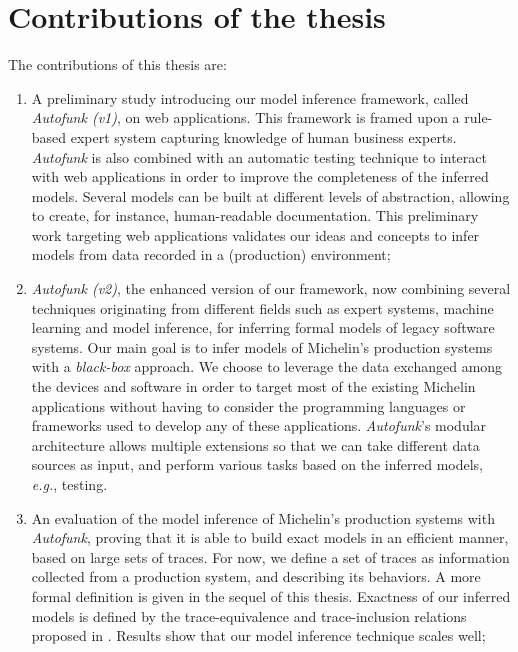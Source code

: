 
\section{Contributions of the thesis}
\label{sec:intro:contrib}

The contributions of this thesis are:

\begin{enumerate}
    \item A preliminary study introducing our model inference
        framework, called \emph{Autofunk (v1)}, on web
        applications. This framework is framed upon a rule-based
        expert system capturing knowledge of human business
        experts. \textit{Autofunk} is also combined with an
        automatic testing technique to interact with web
        applications in order to improve the completeness of the
        inferred models.  Several models can be built at
        different levels of abstraction, allowing to create, for
        instance, human-readable documentation. This preliminary
        work targeting web applications validates our ideas and
        concepts to infer models from data recorded in a
        (production) environment;

    \item \textit{Autofunk (v2)}, the enhanced version of our
        framework, now combining several techniques originating
        from different fields such as expert systems, machine
        learning and model inference, for inferring formal models
        of legacy software systems. Our main goal is to infer
        models of Michelin's production systems with a
        \emph{black-box} approach. We choose to leverage the data
        exchanged among the devices and software in order to
        target most of the existing Michelin applications without
        having to consider the programming languages or
        frameworks used to develop any of these applications.
        \textit{Autofunk}'s modular architecture allows multiple
        extensions so that we can take different data sources as
        input, and perform various tasks based on the inferred
        models, \emph{e.g.}, testing.

    \item An evaluation of the model inference of Michelin's
        production systems with \textit{Autofunk}, proving that
        it is able to build exact models in an efficient manner,
        based on large sets of traces. For now, we define a set
        of traces as information collected from a production
        system, and describing its behaviors. A more formal
        definition is given in the sequel of this thesis.
        Exactness of our inferred models is defined by the
        trace-equivalence and trace-inclusion relations proposed
        in \cite{petrenko06}. Results show that our model
        inference technique scales well;


\end{enumerate}
